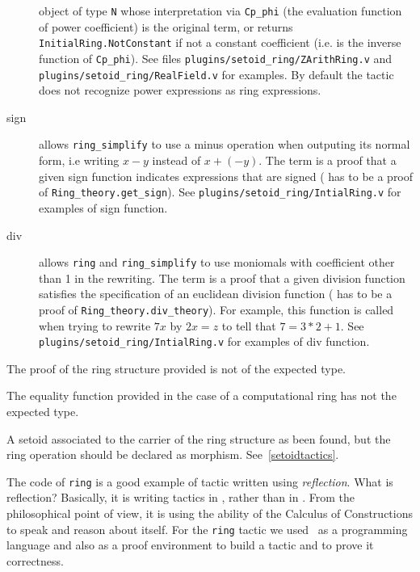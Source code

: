 \begin{description}
  object of type {\tt N} whose interpretation via {\tt Cp\_phi} (the
  evaluation function of power coefficient) is the original term, or
  returns {\tt InitialRing.NotConstant} if not a constant coefficient
  (i.e. {\ltac} is the inverse function of {\tt Cp\_phi}).
  See files {\tt plugins/setoid\_ring/ZArithRing.v} and
  {\tt plugins/setoid\_ring/RealField.v} for examples.
  By default the tactic does not recognize power expressions as ring
  expressions.
\item[sign {\term}] allows {\tt ring\_simplify} to use a minus operation
  when outputing its normal form, i.e writing $x - y$ instead of $x + (-y)$. 
  The term {\term} is a proof that a given sign function indicates expressions
   that are signed ({\term} has to be a
  proof of {\tt Ring\_theory.get\_sign}). See  {\tt plugins/setoid\_ring/IntialRing.v} for examples of sign function.
\item[div {\term}] allows  {\tt ring} and {\tt ring\_simplify} to use moniomals
with coefficient other than 1 in the rewriting. The term {\term} is a proof that a given division function  satisfies the specification of an euclidean
  division function  ({\term} has to be a
  proof of {\tt Ring\_theory.div\_theory}). For example, this function is
  called when trying to rewrite $7x$ by $2x = z$ to tell that $7 = 3 * 2 + 1$.
   See  {\tt plugins/setoid\_ring/IntialRing.v} for examples of div function.
  
\end{description}


\begin{ErrMsgs}
\item {}
  The proof of the ring structure provided is not of the expected type.
\item {}
  The equality function provided in the case of a computational ring
  has not the expected type.
\item {}
  A setoid associated to the carrier of the ring structure as been
  found, but the ring operation should be declared as
  morphism. See~\ref{setoidtactics}.
\end{ErrMsgs}


The code of \texttt{ring} is a good example of tactic written using
\textit{reflection}.  What is reflection? Basically, it is writing
\Coq{} tactics in \Coq, rather than in \ocaml. From the philosophical
point of view, it is using the ability of the Calculus of
Constructions to speak and reason about itself.  For the \texttt{ring}
tactic we used \Coq\ as a programming language and also as a proof
environment to build a tactic and to prove it correctness.


